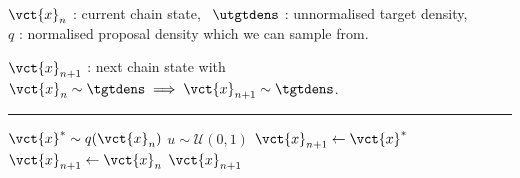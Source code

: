 \begin{algorithmic}
\small
    \Require
    $\vct{x}_n$ : current chain state,~
    $\utgtdens$ : unnormalised target density,\\
    $q$ : normalised proposal density which we can sample from.
    \Ensure\raggedright
    $\vct{x}_{n+1}$ : next chain state with $\vct{x}_n \sim \tgtdens \implies \vct{x}_{n+1} \sim \tgtdens$.
\end{algorithmic}
\hrule
\small
\begin{algorithmic}[1]
  \State $\vct{x}^* \sim q(\vct{x}_{n})$ 
  \State $u \sim \mathcal{U}(0,1)$
  \vspace{0.2mm}
    \vspace{0.1mm}
    \State $\vct{x}_{n+1} \gets \vct{x}^*$ 
  \Else
    \State $\vct{x}_{n+1} \gets \vct{x}_{n}$ 
  \EndIf
  \State \Return $\vct{x}_{n+1}$
\end{algorithmic}
